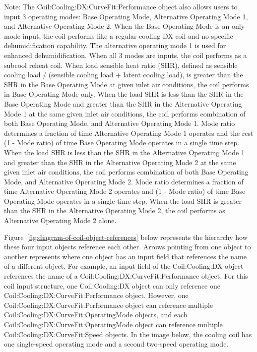 Note: The Coil:Cooling:DX:CurveFit:Performance object also allows users to input 3 operating modes: Base Operating Mode, Alternative Operating Mode 1, and Alternative Operating Mode 2. When the Base Operating Mode is an only mode input, the coil performs like a regular cooling DX coil and no specific dehumidification capability. The alternative operating mode 1 is used for enhanced dehumidification. When all 3 modes are inputs, the coil performs as a subcool reheat coil. When load sensible heat ratio (SHR), defined as sensible cooling load / (sensible cooling load + latent cooling load), is greater than the SHR in the Base Operating Mode at given inlet air conditions, the coil performs in Base Operating Mode only. When the load SHR is less than the SHR in the Base Operating Mode and greater than the SHR in the Alternative Operating Mode 1 at the same given inlet air conditions, the coil performs combination of both Base Operating Mode, and Alternative Operating Mode 1. Mode ratio determines a fraction of time Alternative Operating Mode 1 operates and the rest (1 - Mode ratio) of time Base Operating Mode operates in a single time step. When the load SHR is less than the SHR in the Alternative Operating Mode 1 and greater than the SHR in the Alternative Operating Mode 2 at the same given inlet air conditions, the coil performs combination of both Base Operating Mode, and Alternative Operating Mode 2. Mode ratio determines a fraction of time Alternative Operating Mode 2 operates and (1 - Mode ratio) of time Base Operating Mode operates in a single time step.  When the load SHR is greater than the SHR in the Alternative Operating Mode 2, the coil performs as Alternative Operating Mode 2 alone.   

Figure~\ref{fig:diagram-of-coil-object-references} below represents the hierarchy how these four input objects reference each other. Arrows pointing from one object to another represents where one object has an input field that references the name of a different object. For example, an input field of the Coil:Cooling:DX object references the name of a Coil:Cooling:DX:CurveFit:Performance object. For this coil input structure, one Coil:Cooling:DX object can only reference one Coil:Cooling:DX:CurveFit:Performance object. However, one Coil:Cooling:DX:CurveFit:Performance object can reference multiple Coil:Cooling:DX:CurveFit:OperatingMode objects, and each Coil:Cooling:DX:CurveFit:OperatingMode object can reference multiple Coil:Cooling:DX:CurveFit:Speed objects. In the image below, the cooling coil has one single-speed operating mode and a second two-speed operating mode.

